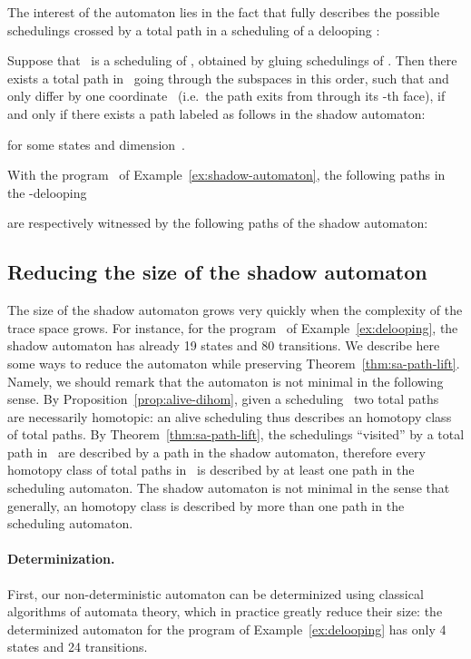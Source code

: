 \documentclass[orivec]{llncs} \usepackage[T1]{fontenc}
\newcommand{\nbd}{\nobreakdash-\hspace{0pt}}
\newcommand{\ie}{i.e.~}
\begin{document}
The interest of the automaton lies in the fact that fully describes the possible
schedulings crossed by a total path in a scheduling of a delooping :
\begin{theorem}
  \label{thm:sa-path-lift}
  Suppose that~ is a scheduling of , obtained by gluing schedulings
   of . Then there exists a total path in~ going through the
  subspaces  in this order, such
  that  and  only differ by one coordinate~ (\ie the path
  exits from  through its \nbd{}th face),
if and only if there exists a path labeled as follows in the shadow automaton:
  
  for some states  and dimension~.
\end{theorem}

\begin{example}
  \label{ex:paths}
  With the program~ of Example~\ref{ex:shadow-automaton}, the following paths
  in the \nbd{}delooping
  \vspace{-2ex}
  
  are respectively witnessed by the following paths of the shadow automaton:
  
\end{example}

\subsection{Reducing the size of the shadow automaton}
The size of the shadow automaton grows very quickly when the complexity of the
trace space grows. For instance, for the program~ of
Example~\ref{ex:delooping}, the shadow automaton has already 19 states and 80
transitions. We describe here some ways to reduce the automaton while preserving
Theorem~\ref{thm:sa-path-lift}. Namely, we should remark that the automaton is
not minimal in the following sense. By Proposition~\ref{prop:alive-dihom}, given
a scheduling~ two total paths~ are necessarily homotopic: an alive
scheduling thus describes an homotopy class of total paths. By
Theorem~\ref{thm:sa-path-lift}, the schedulings ``visited'' by a total path
in~ are described by a path in the shadow automaton, therefore every
homotopy class of total paths in~ is described by at least one path in
the scheduling automaton. The shadow automaton is not minimal in the sense that
generally, an homotopy class is described by more than one path in the
scheduling automaton.

\paragraph{Determinization.}
First, our non-deterministic automaton can be determinized using classical
algorithms of automata theory, which in practice greatly reduce their size: the
determinized automaton for the program of Example~\ref{ex:delooping} has only 4
states and 24 transitions.
\end{document}
